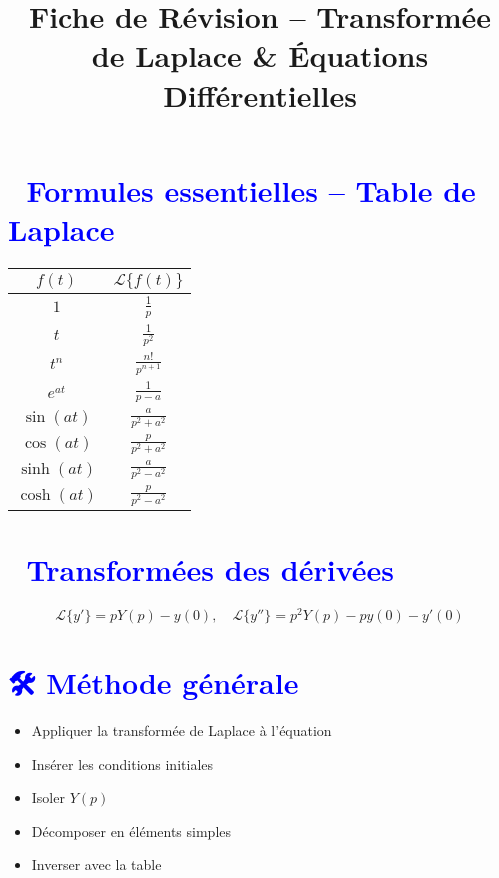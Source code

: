 \documentclass[10pt,a4paper]{article}
\title{\textbf{Fiche de Révision – Transformée de Laplace \& Équations Différentielles}}
\date{}
\author{}
\begin{document}
\maketitle

\begin{multicols}{2}

\section*{\textcolor{blue}{🔷 Formules essentielles – Table de Laplace}}

\begin{tabular}{|c|c|}
\hline
\( f(t) \) & \( \mathcal{L}\{f(t)\} \) \\
\hline
\( 1 \) & \( \frac{1}{p} \) \\
\( t \) & \( \frac{1}{p^2} \) \\
\( t^n \) & \( \frac{n!}{p^{n+1}} \) \\
\( e^{at} \) & \( \frac{1}{p - a} \) \\
\( \sin(at) \) & \( \frac{a}{p^2 + a^2} \) \\
\( \cos(at) \) & \( \frac{p}{p^2 + a^2} \) \\
\( \sinh(at) \) & \( \frac{a}{p^2 - a^2} \) \\
\( \cosh(at) \) & \( \frac{p}{p^2 - a^2} \) \\
\hline
\end{tabular}

\vspace{0.5em}
\section*{\textcolor{blue}{🔁 Transformées des dérivées}}

\[
\mathcal{L}\{y'\} = pY(p) - y(0), \quad
\mathcal{L}\{y''\} = p^2Y(p) - py(0) - y'(0)
\]

\section*{\textcolor{blue}{🛠️ Méthode générale}}

\begin{itemize}
  \item Appliquer la transformée de Laplace à l'équation
  \item Insérer les conditions initiales
  \item Isoler \( Y(p) \)
  \item Décomposer en éléments simples
  \item Inverser avec la table
\end{itemize}


\end{multicols}
\end{document}
